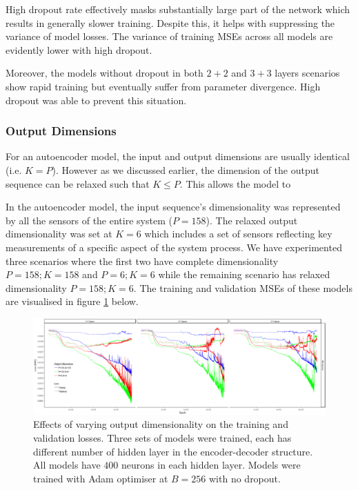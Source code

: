 \documentclass[11pt]{article} %
\theoremstyle{plain}
\theoremstyle{definition}
\begin{document}
High dropout rate effectively masks substantially large part of the network which results in generally slower training. Despite this, it helps with suppressing the variance of model losses. The variance of training MSEs across all models are evidently lower with high dropout. 

Moreover, the models without dropout in both \(2+2\) and \(3+3\) layers scenarios show rapid training but eventually suffer from parameter divergence. High dropout was able to prevent this situation.

\subsubsection{Output Dimensions}

For an autoencoder model, the input and output dimensions are usually identical (i.e. \(K=P\)). However as we discussed earlier, the dimension of the output sequence can be relaxed such that \(K \leqslant P\). This allows the model to 

In the autoencoder model, the input sequence's dimensionality was represented by all the sensors of the entire system (\(P=158\)). The relaxed output dimensionality was set at \(K=6\) which includes a set of sensors reflecting key measurements of a specific aspect of the system process. We have experimented three scenarios where the first two have complete dimensionality \(P=158; K=158\) and \(P=6; K=6\) while the remaining scenario has relaxed dimensionality \(P=158; K=6\). The training and validation MSEs of these models are visualised in figure \ref{fig:output_dims} below.

\begin{figure}[H]
	\centering
	\includegraphics[width=1\textwidth]{output_dims.PNG}
	\caption{Effects of varying output dimensionality on the training and validation losses. Three sets of models were trained, each has different number of hidden layer in the encoder-decoder structure. All models have \(400\) neurons in each hidden layer. Models were trained with Adam optimiser at \(B=256\) with no dropout.}
	\label{fig:output_dims}
\end{figure}
\end{document}
